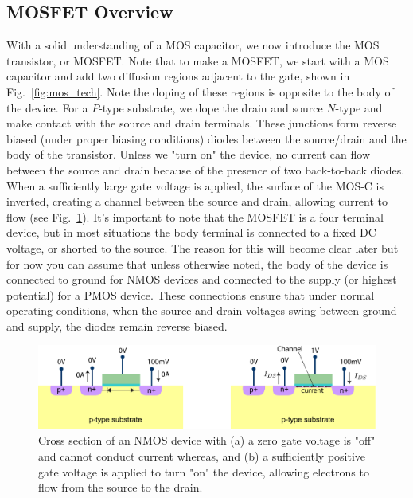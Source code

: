 \subsection{MOSFET Overview}
With a solid understanding of a MOS capacitor, we now introduce the MOS transistor, or MOSFET.  Note that to make a MOSFET, we start with a MOS capacitor and add two diffusion regions adjacent to the gate, shown in Fig.~\ref{fig:mos_tech}.  Note the doping of these regions is opposite to the body of the device.  For a $P$-type substrate, we dope the drain and source $N$-type and make contact with the source and drain terminals.  These junctions form reverse biased (under proper biasing conditions) diodes between the source/drain and the body of the transistor.  Unless we "turn on" the device, no current can flow between the source and drain because of the presence of two back-to-back diodes.  When a sufficiently large gate voltage is applied, the surface of the MOS-C is inverted, creating a channel between the source and drain, allowing current to flow (see Fig.~\ref{fig:mos_current}).    
It's important to note that the MOSFET is a four terminal device, but in most situations the body terminal is connected to a fixed DC voltage, or shorted to the source.  The reason for this will become clear later but for now you can assume that unless otherwise noted, the body of the device is connected to ground for NMOS devices and connected to the supply (or highest potential) for a PMOS device.  These connections ensure that under normal operating conditions, when the source and drain voltages swing between ground and supply, the diodes remain reverse biased.
\begin{figure}[tb]
\centering
\includegraphics[width=\columnwidth]{mostfetxsect_current} 
\caption{Cross section of an NMOS device with (a) a zero gate voltage is "off" and cannot conduct current whereas, and (b) a sufficiently positive gate voltage is applied to turn "on" the device, allowing electrons to flow from the source to the drain.}
\label{fig:mos_current}
\end{figure}
